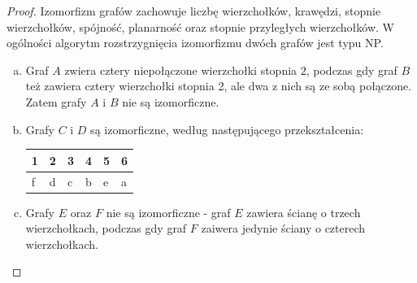 \documentclass[11pt]{article}
\theoremstyle{definition}
\begin{document}
\begin{proof}
    Izomorfizm grafów zachowuje liczbę wierzchołków, krawędzi, stopnie wierzchołków, spójność, planarność oraz stopnie przyległych wierzchołków. W ogólności algorytm rozstrzygnięcia izomorfizmu dwóch grafów jest typu NP.

    \begin{enumerate}[a)]
        \item Graf $A$ zwiera cztery niepołączone wierzchołki stopnia $2$, podczas gdy graf $B$ też zawiera cztery wierzchołki stopnia 2, ale dwa z nich są ze sobą połączone. Zatem grafy $A$ i $B$ nie są izomorficzne.
        \item Grafy $C$ i $D$ są izomorficzne, według następującego przekształcenia:

              \begin{table}[H]
                  \begin{tabular}{|l|l|l|l|l|l|}
                      1 & 2 & 3 & 4 & 5 & 6 \\ \hline
                      f & d & c & b & e & a
                  \end{tabular}
              \end{table}
\item Grafy $E$ oraz $F$ nie są izomorficzne - graf $E$ zawiera ścianę o trzech wierzchołkach, podczas gdy graf $F$ zaiwera jedynie ściany o czterech wierzchołkach.
    \end{enumerate}
\end{proof}
\end{document}
